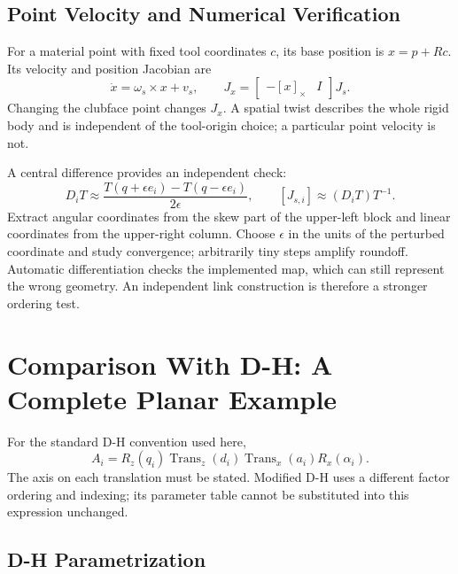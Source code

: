 \subsection{Point Velocity and Numerical Verification}
\label{subsec:jacobian_numerical}

For a material point with fixed tool coordinates $c$, its base position is $x=p+Rc$. Its velocity and position Jacobian are
\begin{equation}
 \dot x=\omega_s\times x+v_s,\qquad
 J_x=\begin{bmatrix}-[x]_\times&I\end{bmatrix}J_s.
\end{equation}
Changing the clubface point changes $J_x$. A spatial twist describes the whole rigid body and is independent of the tool-origin choice; a particular point velocity is not.

A central difference provides an independent check:
\begin{equation}
 D_iT\approx\frac{T(q+\epsilon e_i)-T(q-\epsilon e_i)}{2\epsilon},\qquad
 [J_{s,i}]\approx(D_iT)T^{-1}.
\end{equation}
Extract angular coordinates from the skew part of the upper-left block and linear coordinates from the upper-right column. Choose $\epsilon$ in the units of the perturbed coordinate and study convergence; arbitrarily tiny steps amplify roundoff. Automatic differentiation checks the implemented map, which can still represent the wrong geometry. An independent link construction is therefore a stronger ordering test.

\section{Comparison With D-H: A Complete Planar Example}
\label{sec:dh_limitations}
\label{sec:poe_vs_dh}

For the standard D-H convention used here,
\begin{equation}
 A_i=R_z(q_i)\operatorname{Trans}_z(d_i)
       \operatorname{Trans}_x(a_i)R_x(\alpha_i).
\end{equation}
The axis on each translation must be stated. Modified D-H uses a different factor ordering and indexing; its parameter table cannot be substituted into this expression unchanged.

\subsection{D-H Parametrization}
\label{subsec:dh_example}

